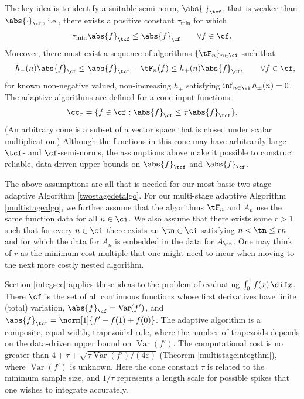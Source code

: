 \documentclass[]{elsarticle}
\DeclareMathOperator{\Var}{Var}
\theoremstyle{definition}
\theoremstyle{remark}
\newcommand{\Fnorm}[1]{\abs{#1}_{\cf}}
\newcommand{\Ftnorm}[1]{\abs{#1}_{\tcf}}
\begin{document}
The key idea is to identify a suitable semi-norm, $\Ftnorm{\cdot}$, that is weaker than $\Fnorm{\cdot}$, i.e., there exists a positive constant $\tau_{\min}$ for which 
\begin{equation} \label{Fspacecondstrong}
\tau_{\min} \Ftnorm{f} \le \Fnorm{f} \qquad \forall f \in \cf.
\end{equation}
Moreover, there must exist a sequence of algorithms $\{\tF_n\}_{n\in \ci}$ such that 
\begin{equation} \label{Gerrbds}
-h_{-}(n)\Fnorm{f} \le \Ftnorm{f}- \tF_n(f) \le h_{+}(n) \Fnorm{f}, \qquad \forall f \in \cf,
\end{equation}
for known non-negative valued, non-increasing $h_{\pm}$ satisfying $\inf_{n \in \ci} h_{\pm}(n) = 0$.  The adaptive algorithms are defined for a cone input functions:
\begin{equation} \label{conedef}
\cc_{\tau}=\{f \in \cf : \Fnorm{f} \le \tau \Ftnorm{f} \}.
\end{equation}
(An arbitrary cone is a subset of a vector space that is closed under scalar multiplication.) Although the functions in this cone may have arbitrarily large $\tcf$- and $\cf$-semi-norms, the assumptions above make it
possible to construct reliable, data-driven upper bounds on $\Ftnorm{f}$ and $\Fnorm{f}$. 

The above assumptions are all that is needed for our most basic two-stage adaptive Algorithm \ref{twostagedetalgo}.  For our multi-stage adaptive Algorithm \ref{multistagealgo}, we further assume that the algorithms $\tF_n$ and $A_n$ use the same function data for all $n \in \ci$.  We also assume that there exists some $r>1$ such that for every $n \in \ci$ there exists an $\tn \in \ci$ satisfying $n < \tn \le rn$ and for which the data for $A_n$ is embedded in the data for $A_{\tn}$. One may think of $r$ as the minimum cost multiple that one might need to incur when moving to the next more costly nested algorithm.

Section \ref{integsec} applies these ideas to the problem of evaluating $\int_0^1 f(x) \, \dif x$.  There $\cf$ is the set of all continuous functions whose first derivatives have finite (total) variation, $\Fnorm{f}=\Var(f')$, and $\Ftnorm{f}=\norm[1]{f'-f(1)+f(0)}$.  The adaptive algorithm is a composite, equal-width, trapezoidal rule, where the number of trapezoids depends on the data-driven upper bound on $\Var(f')$.  The computational cost is no greater than $4+ \tau + \sqrt{\tau \Var(f')/(4\varepsilon)}$ (Theorem \ref{multistageintegthm}), where $\Var(f')$ is unknown. Here the cone constant $\tau$ is related to the minimum sample size, and $1/\tau$ represents a length scale for possible spikes that one wishes to integrate accurately.
\end{document}

